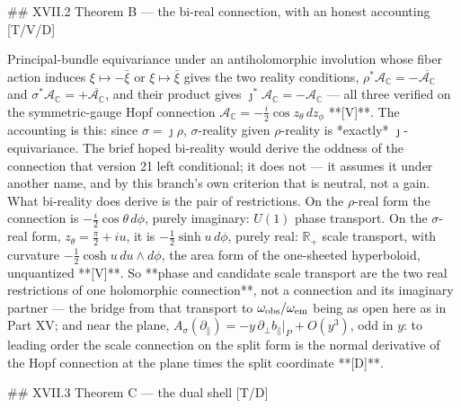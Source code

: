 ## XVII.2 Theorem B — the bi-real connection, with an honest accounting [T/V/D]

Principal-bundle equivariance under an antiholomorphic involution whose fiber action induces $\xi\mapsto-\bar\xi$ or $\xi\mapsto\bar\xi$ gives the two reality conditions, $\rho^*\mathcal A_{\mathbb C} = -\overline{\mathcal A_{\mathbb C} }$ and $\sigma^*\mathcal A_{\mathbb C} = +\overline{\mathcal A_{\mathbb C} }$, and their product gives $\jmath^*\mathcal A_{\mathbb C} = -\mathcal A_{\mathbb C}$ — all three verified on the symmetric-gauge Hopf connection $\mathcal A_{\mathbb C} = -\tfrac i2\cos z_\theta\,dz_\phi$ **[V]**. The accounting is this: since $\sigma = \jmath\rho$, $\sigma$-reality given $\rho$-reality is *exactly* $\jmath$-equivariance. The brief hoped bi-reality would derive the oddness of the connection that version 21 left conditional; it does not — it assumes it under another name, and by this branch's own criterion that is neutral, not a gain. What bi-reality does derive is the pair of restrictions. On the $\rho$-real form the connection is $-\tfrac i2\cos\theta\,d\phi$, purely imaginary: $U(1)$ phase transport. On the $\sigma$-real form, $z_\theta = \tfrac\pi2+iu$, it is $-\tfrac12\sinh u\,d\phi$, purely real: $\mathbb R_+$ scale transport, with curvature $-\tfrac12\cosh u\,du\wedge d\phi$, the area form of the one-sheeted hyperboloid, unquantized **[V]**. So **phase and candidate scale transport are the two real restrictions of one holomorphic connection**, not a connection and its imaginary partner — the bridge from that transport to $\omega_{\rm obs}/\omega_{\rm em}$ being as open here as in Part XV; and near the plane, $A_\sigma(\partial_\parallel) = -y\,\partial_\perp b_\parallel|_P+O(y^3)$, odd in $y$: to leading order the scale connection on the split form is the normal derivative of the Hopf connection at the plane times the split coordinate **[D]**.

## XVII.3 Theorem C — the dual shell [T/D]

